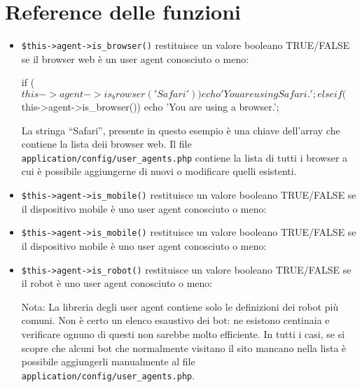 \section*{Reference delle funzioni}
\begin{itemize}
\item \verb|$this->agent->is_browser()| restituisce un valore booleano TRUE/FALSE se il browser web è un user agent conosciuto o meno:

\begin{code}
if ($this->agent->is_browser('Safari'))
{
    echo 'You are using Safari.';
}
else if ($this->agent->is_browser())
{
    echo 'You are using a browser.';
}
\end{code}

La stringa ``Safari'', presente in questo esempio è una chiave dell'array che contiene la lista deii browser web. Il file \verb|application/config/user_agents.php| contiene la lista di tutti i browser a cui è possibile aggiungerne di nuovi o modificare quelli esistenti.

\item \verb|$this->agent->is_mobile()| restituisce un valore booleano TRUE/FALSE se il dispositivo mobile è uno user agent conosciuto o meno:


\item \verb|$this->agent->is_mobile()| restituisce un valore booleano TRUE/FALSE se il dispositivo mobile è uno user agent conosciuto o meno:


\item \verb|$this->agent->is_robot()| restituisce un valore booleano TRUE/FALSE se il robot è uno user agent conosciuto o meno:

Nota: La libreria degli user agent contiene solo le definizioni dei robot più comuni. Non è certo un elenco esaustivo dei bot: ne esistono centinaia e verificare ognuno di questi non sarebbe molto efficiente. In tutti i casi, se si scopre che alcuni bot che normalmente visitano il sito mancano nella lista è possibile aggiungerli manualmente al file \verb|application/config/user_agents.php|.


\end{itemize}
